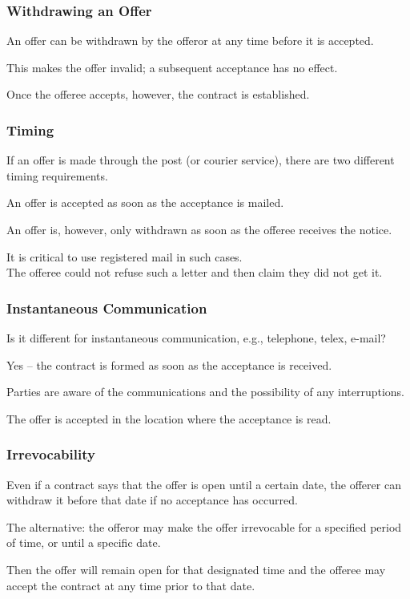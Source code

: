 \begin{frame}
\frametitle{Withdrawing an Offer}

An offer can be withdrawn by the offeror at any time before it is accepted.

This makes the offer invalid; a subsequent acceptance has no effect.

Once the offeree accepts, however, the contract is established.

\end{frame}



\begin{frame}
\frametitle{Timing}

If an offer is made through the post (or courier service), there are two different timing requirements.

An offer is accepted as soon as the acceptance is mailed.

An offer is, however, only withdrawn as soon as the offeree receives the notice.


It is critical to use registered mail in such cases.\\
\quad The offeree could not refuse such a letter and then claim they did not get it.

\end{frame}



\begin{frame}
\frametitle{Instantaneous Communication}

Is it different for instantaneous communication, e.g., telephone, telex, e-mail?

Yes -- the contract is formed as soon as the acceptance is received.

Parties are aware of the communications and the possibility of any interruptions.

The offer is accepted in the location where the acceptance is read.

\end{frame}




\begin{frame}
\frametitle{Irrevocability}

Even if a contract says that the offer is open until a certain date, the offerer can withdraw it before that date if no acceptance has occurred.

The alternative: the offeror may make the offer \alert{irrevocable} for a specified period of time, or until a specific date.

Then the offer will remain open for that designated time and the offeree may accept the contract at any time prior to that date.

\end{frame}



